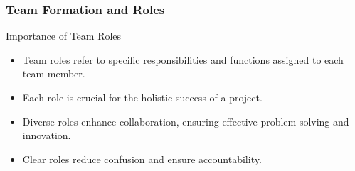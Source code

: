 \documentclass[aspectratio=169]{beamer}
\begin{document}
\begin{frame}[fragile]
    \frametitle{Team Formation and Roles}
    \begin{block}{Importance of Team Roles}
        \begin{itemize}
            \item Team roles refer to specific responsibilities and functions assigned to each team member.
            \item Each role is crucial for the holistic success of a project.
            \item Diverse roles enhance collaboration, ensuring effective problem-solving and innovation.
            \item Clear roles reduce confusion and ensure accountability.
        \end{itemize}
    \end{block}
\end{frame}
\end{document}

